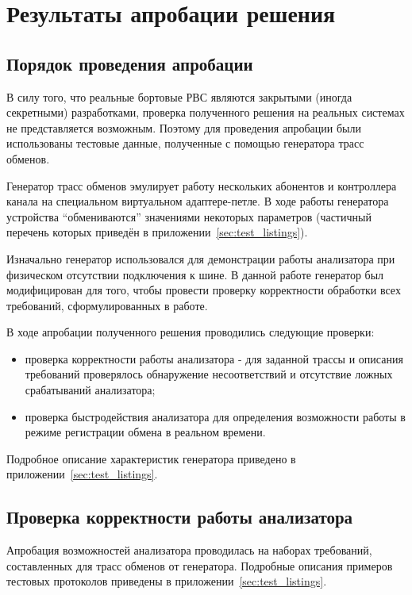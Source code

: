 \section{Результаты апробации решения}


\subsection{Порядок проведения апробации}

В силу того, что реальные бортовые РВС являются закрытыми (иногда секретными) 
разработками, проверка полученного решения на реальных системах не 
представляется возможным. Поэтому для проведения апробации были использованы 
тестовые данные, полученные с помощью генератора трасс обменов.

Генератор трасс обменов эмулирует работу нескольких абонентов и контроллера 
канала на специальном виртуальном адаптере-петле. В ходе работы генератора 
устройства ``обмениваются'' значениями некоторых параметров (частичный перечень 
которых приведён в приложении~\ref{sec:test_listings}).

Изначально генератор использовался для демонстрации работы анализатора при 
физическом отсутствии подключения к шине. В данной работе генератор был 
модифицирован для того, чтобы провести проверку корректности обработки всех 
требований, сформулированных в работе.

В ходе апробации полученного решения проводились следующие проверки:

\begin{itemize}
 \item проверка корректности работы анализатора - для заданной трассы и 
описания требований проверялось обнаружение несоответствий и отсутствие ложных 
срабатываний анализатора;
 \item проверка быстродействия анализатора для определения возможности работы в 
режиме регистрации обмена в реальном времени.
\end{itemize}

Подробное описание характеристик генератора приведено в 
приложении~\ref{sec:test_listings}.

\subsection{Проверка корректности работы анализатора}

Апробация возможностей анализатора проводилась на наборах требований, 
составленных для трасс обменов от генератора. 
Подробные описания примеров тестовых протоколов приведены в 
приложении~\ref{sec:test_listings}.

